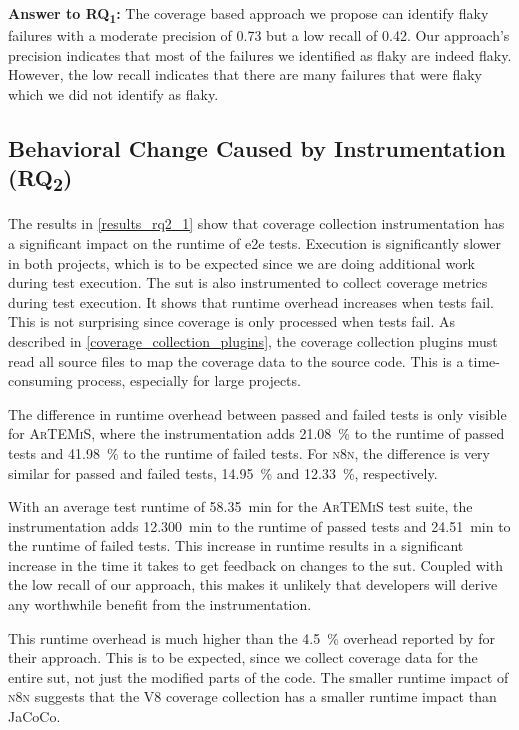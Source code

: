 \begin{mdframed}
	\textbf{Answer to RQ\textsubscript{1}:} The coverage based approach we propose can identify flaky failures with a moderate precision of \num{0.73} but a low recall of \num{0.42}.
	Our approach's precision indicates that most of the failures we identified as flaky are indeed flaky.
	However, the low recall indicates that there are many failures that were flaky which we did not identify as flaky.
\end{mdframed}

\subsection{Behavioral Change Caused by Instrumentation (\texorpdfstring{RQ\textsubscript{2}}{RQ2})}

The results in \cref{results_rq2_1} show that coverage collection instrumentation has a significant impact on the runtime of \ac{e2e} tests.
Execution is significantly slower in both projects, which is to be expected since we are doing additional work during test execution.
The \ac{sut} is also instrumented to collect coverage metrics during test execution.
It shows that runtime overhead increases when tests fail.
This is not surprising since coverage is only processed when tests fail.
As described in \cref{coverage_collection_plugins}, the coverage collection plugins must read all source files to map the coverage data to the source code.
This is a time-consuming process, especially for large projects.

The difference in runtime overhead between passed and failed tests is only visible for \textsc{ArTEMiS}, where the instrumentation adds \SI{21.08}{\percent} to the runtime of passed tests and \SI{41.98}{\percent} to the runtime of failed tests.
For \textsc{n8n}, the difference is very similar for passed and failed tests, \SI{14.95}{\percent} and \SI{12.33}{\percent}, respectively.

With an average test runtime of \SI{58.35}{\minute} for the \textsc{ArTEMiS} test suite, the instrumentation adds \SI{12.300}{\minute} to the runtime of passed tests and \SI{24.51}{\minute} to the runtime of failed tests.
This increase in runtime results in a significant increase in the time it takes to get feedback on changes to the \ac{sut}.
Coupled with the low recall of our approach, this makes it unlikely that developers will derive any worthwhile benefit from the instrumentation.

This runtime overhead is much higher than the \SI{4.5}{\percent} overhead reported by \citeauthor*{bell_deflaker_2018} for their approach.
This is to be expected, since we collect coverage data for the entire \ac{sut}, not just the modified parts of the code.
The smaller runtime impact of \textsc{n8n} suggests that the V8 coverage collection has a smaller runtime impact than JaCoCo.

